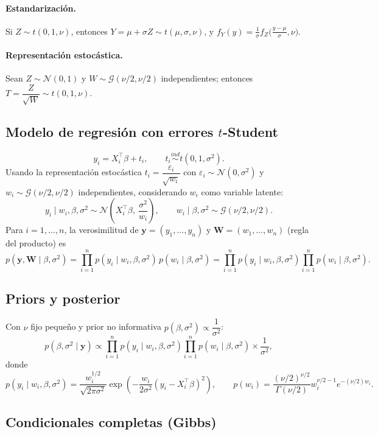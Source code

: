 \documentclass[11pt]{article}
\newcommand{\N}{\mathcal{N}}
\newcommand{\Ga}{\mathcal{G}}
\newcommand{\by}{\mathbf{y}}
\newcommand{\bW}{\mathbf{W}}
\theoremstyle{definition}
\begin{document}
\paragraph{Estandarización.} Si $Z\sim t(0,1,\nu)$, entonces $Y=\mu+\sigma Z\sim t(\mu,\sigma,\nu)$, y $f_Y(y)=\tfrac{1}{\sigma}f_Z\big(\tfrac{y-\mu}{\sigma},\nu\big)$.

\paragraph{Representación estocástica.} Sean $Z\sim\N(0,1)$ y $W\sim\Ga(\nu/2,\nu/2)$ independientes; entonces $T=\dfrac{Z}{\sqrt{W}}\sim t(0,1,\nu)$.

\subsection{Modelo de regresión con errores $t$-Student}
\[
y_i=X_i^{\top}\beta+t_i,\qquad t_i\overset{ind}{\sim}t(0,1,\sigma^2).
\]
Usando la representación estocástica $t_i=\dfrac{\varepsilon_i}{\sqrt{w_i}}$ con $\varepsilon_i\sim\N(0,\sigma^2)$ y $w_i\sim\Ga(\nu/2,\nu/2)$ independientes, considerando $w_i$ como variable latente:
\[
y_i\mid w_i,\beta,\sigma^2\sim\N\!\left(X_i^{\top}\beta,\ \frac{\sigma^2}{w_i}\right),\qquad w_i\mid\beta,\sigma^2\sim\Ga(\nu/2,\nu/2).
\]
Para $i=1,\dots,n$, la verosimilitud de $\by=(y_1,\dots,y_n)$ y $\bW=(w_1,\dots,w_n)$ (regla del producto) es
\[
p(\by,\bW\mid\beta,\sigma^2)=\prod_{i=1}^n p(y_i\mid w_i,\beta,\sigma^2)\,p(w_i\mid\beta,\sigma^2)=\prod_{i=1}^n p(y_i\mid w_i,\beta,\sigma^2)\prod_{i=1}^n p(w_i\mid\beta,\sigma^2).
\]

\subsection{Priors y posterior}
Con $\nu$ fijo pequeño y prior no informativa $p(\beta,\sigma^2)\propto\dfrac{1}{\sigma^2}$:
\[
p(\beta,\sigma^2\mid\by)\propto\prod_{i=1}^n p(y_i\mid w_i,\beta,\sigma^2)\prod_{i=1}^n p(w_i\mid\beta,\sigma^2)\times\frac{1}{\sigma^2},
\]
donde
\[
p(y_i\mid w_i,\beta,\sigma^2)=\frac{w_i^{1/2}}{\sqrt{2\pi\sigma^2}}\exp\!\left(-\frac{w_i}{2\sigma^2}(y_i-X_i^{\top}\beta)^2\right),\qquad
p(w_i)=\frac{(\nu/2)^{\nu/2}}{\Gamma(\nu/2)}w_i^{\nu/2-1}e^{-(\nu/2)w_i}.
\]

\subsection{Condicionales completas (Gibbs)}
\end{document}
